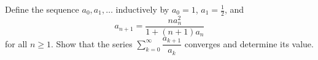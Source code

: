 Define the sequence \(a_0,a_1,\dots\) inductively by \(a_0=1\), \(a_1=\frac{1}{2}\), and
\[a_{n+1}=\dfrac{n a_n^2}{1+(n+1)a_n}\]
for all \(n \ge 1\).
Show that the series \(\sum_{k=0}^\infty \dfrac{a_{k+1}}{a_k}\) converges and determine its value.

